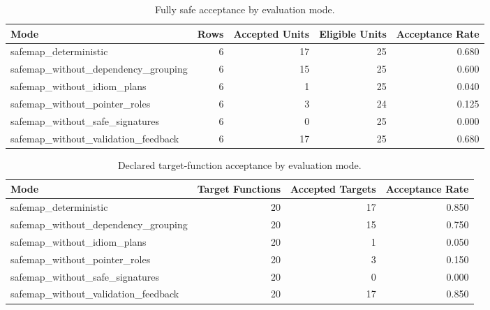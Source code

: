 \begin{table}[t]
\centering
\caption{Fully safe acceptance by evaluation mode.}
\label{tab:safemap-mode-summary}
\begin{tabular}{lrrrr}
\hline
Mode & Rows & Accepted Units & Eligible Units & Acceptance Rate \\
\hline
safemap\_deterministic & 6 & 17 & 25 & 0.680 \\
safemap\_without\_dependency\_grouping & 6 & 15 & 25 & 0.600 \\
safemap\_without\_idiom\_plans & 6 & 1 & 25 & 0.040 \\
safemap\_without\_pointer\_roles & 6 & 3 & 24 & 0.125 \\
safemap\_without\_safe\_signatures & 6 & 0 & 25 & 0.000 \\
safemap\_without\_validation\_feedback & 6 & 17 & 25 & 0.680 \\
\hline
\end{tabular}
\end{table}

\begin{table}[t]
\centering
\caption{Declared target-function acceptance by evaluation mode.}
\label{tab:safemap-target-summary}
\begin{tabular}{lrrr}
\hline
Mode & Target Functions & Accepted Targets & Acceptance Rate \\
\hline
safemap\_deterministic & 20 & 17 & 0.850 \\
safemap\_without\_dependency\_grouping & 20 & 15 & 0.750 \\
safemap\_without\_idiom\_plans & 20 & 1 & 0.050 \\
safemap\_without\_pointer\_roles & 20 & 3 & 0.150 \\
safemap\_without\_safe\_signatures & 20 & 0 & 0.000 \\
safemap\_without\_validation\_feedback & 20 & 17 & 0.850 \\
\hline
\end{tabular}
\end{table}

